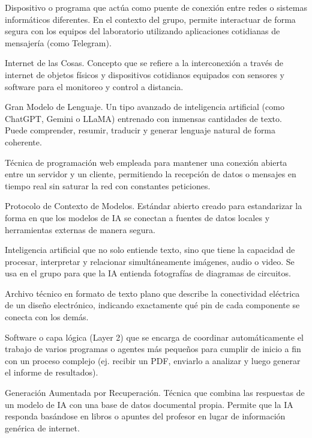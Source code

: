 \documentclass[12pt, a4paper]{article}
\begin{document}
\begin{description}[style=nextline, leftmargin=1.5em, itemsep=0.8em]
    \item[Gateway (Pasarela)] 
    Dispositivo o programa que actúa como puente de conexión entre redes o sistemas informáticos diferentes. En el contexto del grupo, permite interactuar de forma segura con los equipos del laboratorio utilizando aplicaciones cotidianas de mensajería (como Telegram).

    \item[IoT (Internet of Things)] 
    Internet de las Cosas. Concepto que se refiere a la interconexión a través de internet de objetos físicos y dispositivos cotidianos equipados con sensores y software para el monitoreo y control a distancia.

    \item[LLM (Large Language Model)] 
    Gran Modelo de Lenguaje. Un tipo avanzado de inteligencia artificial (como ChatGPT, Gemini o LLaMA) entrenado con inmensas cantidades de texto. Puede comprender, resumir, traducir y generar lenguaje natural de forma coherente.

    \item[Long Polling] 
    Técnica de programación web empleada para mantener una conexión abierta entre un servidor y un cliente, permitiendo la recepción de datos o mensajes en tiempo real sin saturar la red con constantes peticiones.

    \item[MCP (Model Context Protocol)] 
    Protocolo de Contexto de Modelos. Estándar abierto creado para estandarizar la forma en que los modelos de IA se conectan a fuentes de datos locales y herramientas externas de manera segura.

    \item[Multimodal (IA Multimodal)] 
    Inteligencia artificial que no solo entiende texto, sino que tiene la capacidad de procesar, interpretar y relacionar simultáneamente imágenes, audio o video. Se usa en el grupo para que la IA entienda fotografías de diagramas de circuitos.

    \item[Netlist (Lista de Redes)] 
    Archivo técnico en formato de texto plano que describe la conectividad eléctrica de un diseño electrónico, indicando exactamente qué pin de cada componente se conecta con los demás.

    \item[Orquestador (Orquestación)] 
    Software o capa lógica (Layer 2) que se encarga de coordinar automáticamente el trabajo de varios programas o agentes más pequeños para cumplir de inicio a fin con un proceso complejo (ej. recibir un PDF, enviarlo a analizar y luego generar el informe de resultados).

    \item[RAG (Retrieval-Augmented Generation)] 
    Generación Aumentada por Recuperación. Técnica que combina las respuestas de un modelo de IA con una base de datos documental propia. Permite que la IA responda basándose en libros o apuntes del profesor en lugar de información genérica de internet.

\end{description}
\end{document}

